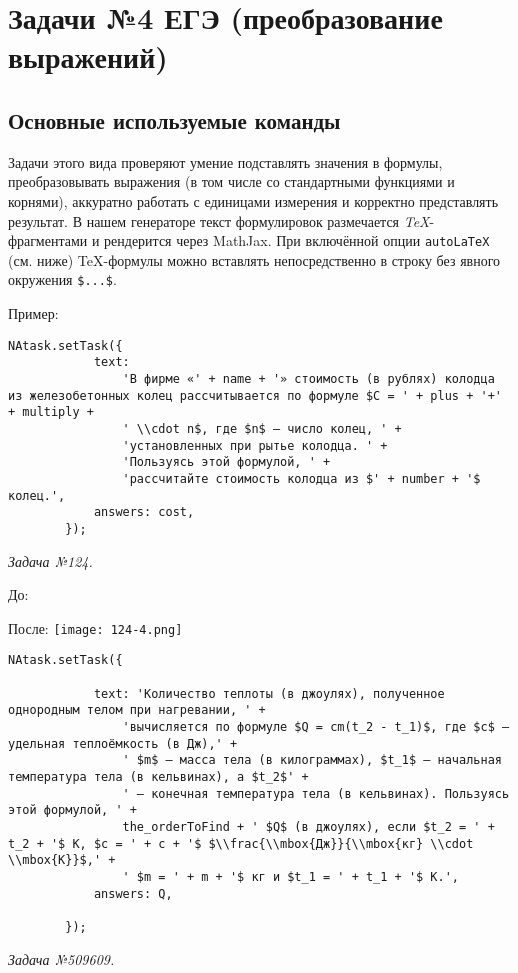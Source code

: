 \section{Задачи №4 ЕГЭ (преобразование выражений)}

\subsection{Основные используемые команды}

Задачи этого вида проверяют умение подставлять значения в формулы, преобразовывать выражения (в том числе со стандартными функциями и корнями), аккуратно работать с единицами измерения и корректно представлять результат. 
В нашем генераторе текст формулировок размечается \emph{TeX}-фрагментами и рендерится через MathJax. 
При включённой опции \verb|autoLaTeX| (см. ниже) TeX-формулы можно вставлять непосредственно в строку без явного окружения \verb|$...$|.

Пример:
\begin{lstlisting}
NAtask.setTask({
			text:
				'В фирме «' + name + '» стоимость (в рублях) колодца из железобетонных колец рассчитывается по формуле $C = ' + plus + '+' + multiply + 
				' \\cdot n$, где $n$ – число колец, ' +
				'установленных при рытье колодца. ' +
				'Пользуясь этой формулой, ' +
				'рассчитайте стоимость колодца из $' + number + '$ колец.',
			answers: cost,
		});
\end{lstlisting}
\textsl{Задача №124.}

 
До:

После:
\texttt{[image: 124-4.png]}
\begin{lstlisting}
NAtask.setTask({

			text: 'Количество теплоты (в джоулях), полученное однородным телом при нагревании, ' +
				'вычисляется по формуле $Q = cm(t_2 - t_1)$, где $c$ – удельная теплоёмкость (в Дж),' +
				' $m$ – масса тела (в килограммах), $t_1$ – начальная температура тела (в кельвинах), а $t_2$' +
				' – конечная температура тела (в кельвинах). Пользуясь этой формулой, ' +
				the_orderToFind + ' $Q$ (в джоулях), если $t_2 = ' + t_2 + '$ К, $c = ' + c + '$ $\\frac{\\mbox{Дж}}{\\mbox{кг} \\cdot \\mbox{К}}$,' +
				' $m = ' + m + '$ кг и $t_1 = ' + t_1 + '$ К.',
			answers: Q,

		});
\end{lstlisting}
\textsl{Задача №509609.}


